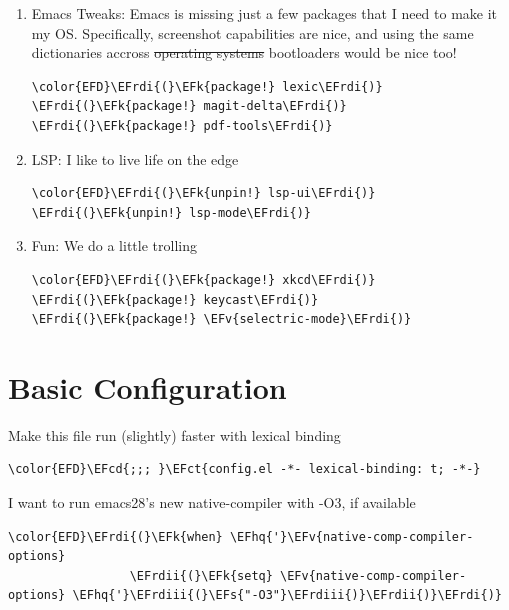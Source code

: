 \documentclass{scrartcl}
\newcommand{\EFk}[1]{\textcolor{EFk}{#1}} %
\newcommand{\EFs}[1]{\textcolor{EFs}{#1}} %
\newcommand{\EFct}[1]{\textcolor{EFct}{#1}} %
\newcommand{\EFv}[1]{\textcolor{EFv}{#1}} %
\newcommand{\EFcd}[1]{\textcolor{EFcd}{#1}} %
\newcommand{\EFhq}[1]{#1} %
\newcommand{\EFrdi}[1]{#1} %
\newcommand{\EFrdii}[1]{#1} %
\newcommand{\EFrdiii}[1]{#1} %
\begin{document}
\begin{enumerate}
\item Emacs Tweaks:
\label{sec:org7a46db4}
Emacs is missing just a few packages that I need to make it my OS. Specifically,
screenshot capabilities are nice, and using the same dictionaries accross
\sout{operating systems} bootloaders would be nice too!
\begin{Code}
\begin{Verbatim}[]
\color{EFD}\EFrdi{(}\EFk{package!} lexic\EFrdi{)}
\EFrdi{(}\EFk{package!} magit-delta\EFrdi{)}
\EFrdi{(}\EFk{package!} pdf-tools\EFrdi{)}
\end{Verbatim}
\end{Code}

\item LSP:
\label{sec:orgcf01477}
I like to live life on the edge
\begin{Code}
\begin{Verbatim}[]
\color{EFD}\EFrdi{(}\EFk{unpin!} lsp-ui\EFrdi{)}
\EFrdi{(}\EFk{unpin!} lsp-mode\EFrdi{)}
\end{Verbatim}
\end{Code}

\item Fun:
\label{sec:orgdc5bce4}
We do a little trolling
\begin{Code}
\begin{Verbatim}[]
\color{EFD}\EFrdi{(}\EFk{package!} xkcd\EFrdi{)}
\EFrdi{(}\EFk{package!} keycast\EFrdi{)}
\EFrdi{(}\EFk{package!} \EFv{selectric-mode}\EFrdi{)}
\end{Verbatim}
\end{Code}
\end{enumerate}

\section{Basic Configuration}
\label{sec:org624f03c}
Make this file run (slightly) faster with lexical binding
\begin{Code}
\begin{Verbatim}[]
\color{EFD}\EFcd{;;; }\EFct{config.el -*- lexical-binding: t; -*-}
\end{Verbatim}
\end{Code}

I want to run emacs28's new native-compiler with -O3, if available
\begin{Code}
\begin{Verbatim}[]
\color{EFD}\EFrdi{(}\EFk{when} \EFhq{'}\EFv{native-comp-compiler-options}
                 \EFrdii{(}\EFk{setq} \EFv{native-comp-compiler-options} \EFhq{'}\EFrdiii{(}\EFs{"-O3"}\EFrdiii{)}\EFrdii{)}\EFrdi{)}
\end{Verbatim}
\end{Code}
\end{document}

